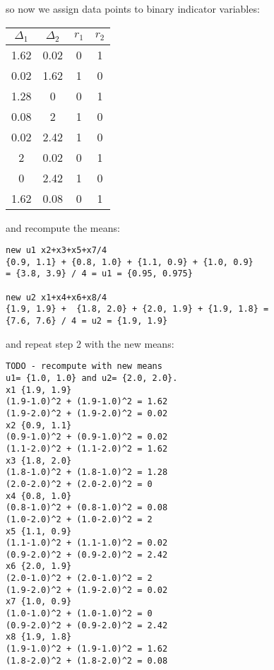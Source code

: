 so now we assign data points to binary indicator variables:
\begin{center}
 \begin{tabular}{||c c c c||} 
 \hline
 $\Delta_1$ & $\Delta_2$ & $r_1$ & $r_2$  \\ [0.5ex] 
 \hline\hline
 1.62 & 0.02 & 0 & 1 \\ 
 \hline
 0.02 & 1.62  & 1 & 0 \\ 
 \hline
1.28 & 0 & 0 & 1 \\
 \hline
0.08 & 2 & 1 & 0 \\
 \hline
 0.02 & 2.42 & 1 & 0 \\ 
  \hline
2 & 0.02 & 0 & 1 \\
 \hline
0 & 2.42 & 1 & 0 \\
 \hline
 1.62 & 0.08 & 0 & 1 \\ [1ex] 
 \hline
\end{tabular}
\end{center}
and recompute the means:
\begin{verbatim}
new u1 x2+x3+x5+x7/4 
{0.9, 1.1} + {0.8, 1.0} + {1.1, 0.9} + {1.0, 0.9} 
= {3.8, 3.9} / 4 = u1 = {0.95, 0.975}

new u2 x1+x4+x6+x8/4 
{1.9, 1.9} +  {1.8, 2.0} + {2.0, 1.9} + {1.9, 1.8} = 
{7.6, 7.6} / 4 = u2 = {1.9, 1.9}
\end{verbatim}
and repeat step 2 with the new means:
\begin{verbatim}
TODO - recompute with new means
u1= {1.0, 1.0} and u2= {2.0, 2.0}.
x1 {1.9, 1.9}
(1.9-1.0)^2 + (1.9-1.0)^2 = 1.62
(1.9-2.0)^2 + (1.9-2.0)^2 = 0.02
x2 {0.9, 1.1}
(0.9-1.0)^2 + (0.9-1.0)^2 = 0.02
(1.1-2.0)^2 + (1.1-2.0)^2 = 1.62
x3 {1.8, 2.0}
(1.8-1.0)^2 + (1.8-1.0)^2 = 1.28
(2.0-2.0)^2 + (2.0-2.0)^2 = 0
x4 {0.8, 1.0}
(0.8-1.0)^2 + (0.8-1.0)^2 = 0.08
(1.0-2.0)^2 + (1.0-2.0)^2 = 2
x5 {1.1, 0.9}
(1.1-1.0)^2 + (1.1-1.0)^2 = 0.02
(0.9-2.0)^2 + (0.9-2.0)^2 = 2.42
x6 {2.0, 1.9}
(2.0-1.0)^2 + (2.0-1.0)^2 = 2
(1.9-2.0)^2 + (1.9-2.0)^2 = 0.02
x7 {1.0, 0.9}
(1.0-1.0)^2 + (1.0-1.0)^2 = 0
(0.9-2.0)^2 + (0.9-2.0)^2 = 2.42
x8 {1.9, 1.8}
(1.9-1.0)^2 + (1.9-1.0)^2 = 1.62
(1.8-2.0)^2 + (1.8-2.0)^2 = 0.08
\end{verbatim}



